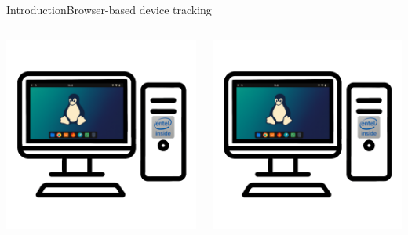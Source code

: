 \documentclass[aspectratio=169, hyperref={colorlinks=true, allcolors=SecondaryColor}, c]{beamer}
\begin{document}
\begin{frame}[fragile]{Introduction}{Browser-based device tracking}
\begin{columns}
\begin{column}{0.33\textwidth}
				\includegraphics[width=1\textwidth]{./figures/computer_alpha_screen_2_golden.png}
			\end{column}
			\begin{column}{0.33\textwidth}
				\includegraphics[width=1\textwidth]{./figures/computer_alpha_screen_2_golden.png}

\end{column}
\end{columns}
\end{frame}
\end{document}
